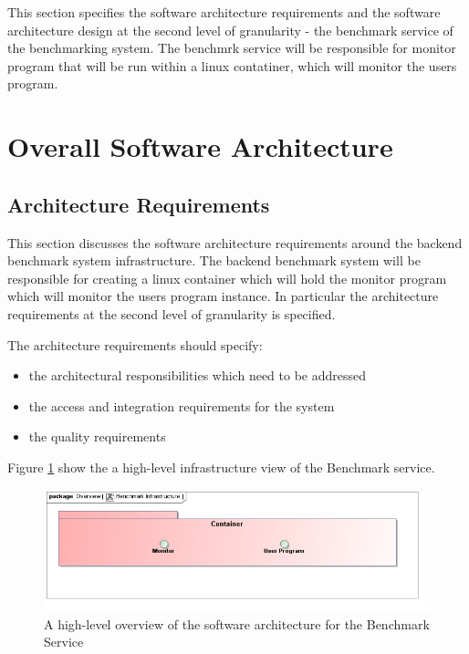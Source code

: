 This section specifies the software architecture requirements and the software
architecture design at the second level of granularity - the benchmark service
of the benchmarking system. The benchmrk service will be responsible for monitor
program that will be run within a linux contatiner, which will monitor the users program.

\section{Overall Software Architecture}
\subsection{Architecture Requirements}
This section discusses the software architecture requirements around the
backend benchmark system infrastructure. The backend benchmark system will be
responsible for creating a linux container which will hold the monitor program
which will monitor the users program instance. In particular
the architecture requirements at the second level of granularity is specified.

The architecture requirements should specify:
\begin{itemize}
	\item the architectural responsibilities which need to be addressed
	\item the access and integration requirements for the system
	\item the quality requirements
\end{itemize}

Figure \ref{fig:benchmarkInfrastructure} show the a high-level infrastructure
view of the Benchmark service.

\begin{figure}[H]
  \begin{center}
  \includegraphics[scale=0.4]{../Diagrams and Charts/Overview/BenchmarkInfrastructure.jpg}
  \caption{A high-level overview of the software architecture for the Benchmark Service}
  \label{fig:benchmarkInfrastructure}
  \end{center}
\end{figure}


